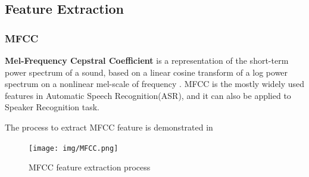 
\subsection{Feature Extraction}


\subsubsection{MFCC}
\label{sec:mfcc}
\textbf{Mel-Frequency Cepstral Coefficient} is a representation of the short-term power spectrum of a sound,
based on a linear cosine transform of a log power spectrum on a nonlinear mel-scale of frequency \cite{mfcc} .
MFCC is the mostly widely used features in Automatic Speech Recognition(ASR), and it can also be applied to Speaker Recognition task.


The process to extract MFCC feature is demonstrated in 
\begin{figure}

  \centering
  \texttt{[image: img/MFCC.png]}
  \caption{MFCC feature extraction process\label{fig:mfcc}}

\end{figure}

